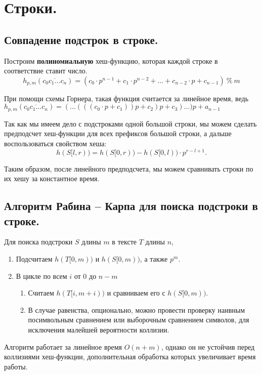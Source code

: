 \section{Строки.}%


\subsection{Совпадение подстрок в строке.}%

Построим \textbf{полиномиальную} хеш-функцию, которая каждой строке в соответствие ставит число.
\[h_{p, m}(\overline{c_{0}c_{1}...c_{n}}) = (c_0 \cdot p^{n - 1} + c_1 \cdot p^{n-2} + ... + c_{n - 2} \cdot p + c_{n - 1}) \ \% \ m\]

При помощи схемы Горнера, такая функция считается за линейное время, ведь $h_{p, m}(\overline{c_{0}c_{1}...c_{n}}) = (...(((c_0 \cdot p + c_1))p + c_2)p + c_3)...)p + a_{n-1}$

Так как мы имеем дело с подстроками одной большой строки, мы можем сделать предподсчет хеш-функции для всех префиксов большой строки, а дальше воспользоваться свойством хеша:
\[
	h(S[l, r)) = h(S[0, r)) - h(S[0, l)) \cdot p^{r - l + 1}
.\] 

Таким образом, после линейного предподсчета, мы можем сравнивать строки по их хешу за константное время.


\subsection{Алгоритм Рабина -- Карпа для поиска подстроки в строке.}%

Для поиска подстроки $S$ длины $m$ в тексте $T$ длины $n$, 
\begin{enumerate}
	\item Подсчитаем $h(T[0, m))$ и $h(S[0, m))$, а также $p^m$.
	\item В цикле по всем $i$ от  $0$ до $n - m$
		\begin{enumerate}
			\item Считаем $h(T[i, m + i))$ и сравниваем его с $h(S[0, m))$. 
			\item В случае равенства, опционально, можно провести проверку наивным посимвольным сравнением или выборочным сравнением символов, для исключения малейшей вероятности коллизии.
		\end{enumerate}
\end{enumerate}

Алгоритм работает за линейное время $O(n + m)$, однако он не устойчив перед коллизиями хеш-функции, дополнительная обработка которых увеличивает время работы.



